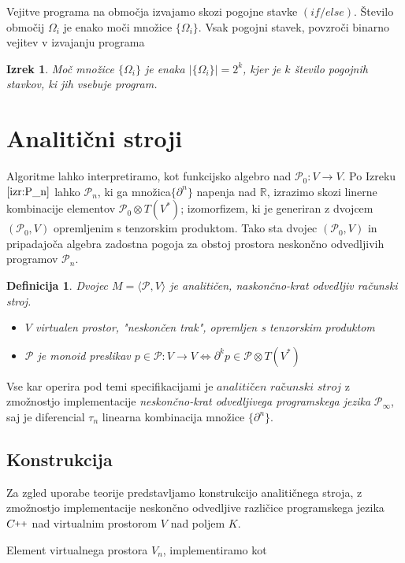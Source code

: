 \documentclass{article}
\newcommand{\RR}{\mathbb{R}}
\newcommand{\CC}{C\nolinebreak\hspace{-.05em}\raisebox{.4ex}{\tiny\bf +}\nolinebreak\hspace{-.10em}\raisebox{.4ex}{\tiny\bf +}}
\def\CC{{C\nolinebreak[4]\hspace{-.05em}\raisebox{.4ex}{\tiny\bf ++}}}
\newcommand{\dP}{\mathcal{P}}
\newcommand{\D}{\partial}
\newcommand{\sumd}{\tau}
\newtheorem{definicija}{Definicija}[section]
\newtheorem{izrek}{Izrek}[section]
\begin{document}
Vejitve programa na območja izvajamo skozi pogojne stavke $(if/else)$. Število območij $\Omega_i$ je enako moči množice $\{\Omega_i\}$. Vsak pogojni stavek, povzroči binarno vejitev v izvajanju programa

\begin{izrek}
Moč množice $\{\Omega_i\}$ je enaka $\lvert\{\Omega_i \}\rvert=2^k$, kjer je $k$ število pogojnih stavkov, ki jih vsebuje program.
\end{izrek}

\newpage
\section{Analitični stroji}
Algoritme lahko interpretiramo, kot funkcijsko algebro nad $\dP_0:V\to V$. 
Po Izreku $\ref{izr:P_n}$ lahko $\dP_n$, ki ga množica$\{\D^n\}$ napenja nad $\RR$, izrazimo skozi linerne kombinacije elementov $\dP_0\otimes T(V^*)$; izomorfizem, ki je generiran z dvojcem $(\dP_0,V)$ opremljenim s tenzorskim produktom. Tako sta dvojec $(\dP_0,V)$ in pripadajoča algebra zadostna pogoja za obstoj prostora neskončno odvedljivih programov $\dP_n$.

\begin{definicija}
   Dvojec $M=\langle\dP, V\rangle$ je analitičen, naskončno-krat odvedljiv računski stroj.
   
    \begin{itemize}
    \item
    $V$ virtualen prostor, "neskončen trak", opremljen s tenzorskim produktom
    \item
    $\dP$ je monoid preslikav $p\in\dP:V\to V\iff\D^k p\in \dP\otimes T(V^*)$
    \end{itemize}
  \end{definicija}
  Vse kar operira pod temi specifikacijami je $\textit{analitičen računski stroj}$ z zmožnostjo implementacije \textit{neskončno-krat odvedljivega programskega jezika} $\dP_\infty$, saj je diferencial $\sumd_n$ linearna kombinacija množice $\{\D^n\}$. 
  
  \subsection{Konstrukcija}
  Za zgled uporabe teorije predstavljamo konstrukcijo analitičnega stroja, z zmožnostjo implementacije neskončno odvedljive različice programskega jezika $\CC$ nad virtualnim prostorom $V$ nad poljem $K$.
  
  Element virtualnega prostora $V_n$, implementiramo kot
  
\end{document}
